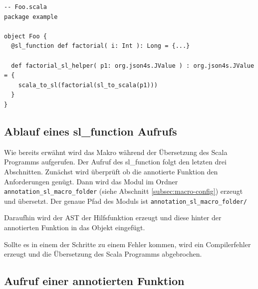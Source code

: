 \documentclass[12pt,bibtotoc]{scrreprt}
\begin{document}
\begin{lstlisting}[caption=Hilfsfunktion zur Funktion aus Listing \ref{lst:example-function}, label=lst:helperfunction, float=h]
-- Foo.scala
package example

object Foo {
  @sl_function def factorial( i: Int ): Long = {...}
  
  def factorial_sl_helper( p1: org.json4s.JValue ) : org.json4s.JValue = {
    scala_to_sl(factorial(sl_to_scala(p1)))
  }
}
\end{lstlisting}

\subsection{Ablauf eines sl\_function Aufrufs}

Wie bereits erwähnt wird das Makro während der Übersetzung des Scala Programms aufgerufen. Der Aufruf des sl\_function folgt den letzten drei Abschnitten. Zunächst wird überprüft ob die annotierte Funktion den Anforderungen genügt. Dann wird das Modul im Ordner \lstinline!annotation_sl_macro_folder! (siehe Abschnitt \ref{subsec:macro-config}) erzeugt und übersetzt. Der genaue Pfad des Moduls ist \lstinline!annotation_sl_macro_folder/!

 Daraufhin wird der \ac{AST} der Hilfsfunktion erzeugt und diese hinter der annotierten Funktion in das Objekt eingefügt. 

Sollte es in einem der Schritte zu einem Fehler kommen, wird ein Compilerfehler erzeugt und die Übersetzung des Scala Programms abgebrochen.

\subsection{Aufruf einer annotierten Funktion}
\label{subs:call-scala-functions}
\end{document}
